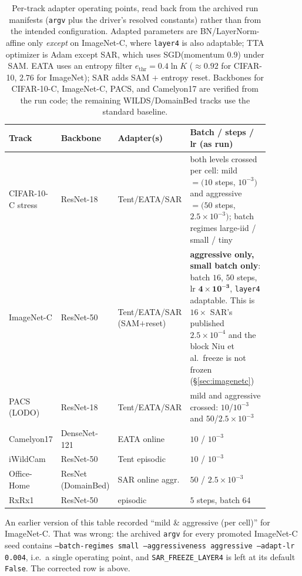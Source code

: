 \begin{table}[t]\centering\footnotesize
\caption{Per-track adapter operating points, read back from the archived run manifests
(\texttt{argv} plus the driver's resolved constants) rather than from the intended configuration.
Adapted parameters are BN/LayerNorm-affine only \emph{except} on ImageNet-C, where
\texttt{layer4} is also adaptable; TTA optimizer is Adam except SAR, which uses
SGD(momentum $0.9$) under SAM. EATA uses an entropy filter $e_{\mathrm{thr}}{=}0.4\ln K$
($\approx0.92$ for CIFAR-10, $2.76$ for ImageNet); SAR adds SAM $+$ entropy reset.
Backbones for CIFAR-10-C, ImageNet-C, PACS, and Camelyon17 are verified from the run code; the
remaining WILDS/DomainBed tracks use the standard baseline.}
\label{tab:adapter-hparams}
\begin{tabular}{@{}p{0.17\linewidth}p{0.17\linewidth}p{0.20\linewidth}p{0.34\linewidth}@{}}
\toprule
Track & Backbone & Adapter(s) & Batch / steps / lr (as run) \\
\midrule
CIFAR-10-C stress & ResNet-18 & Tent/EATA/SAR & both levels crossed per cell: mild $=(10$ steps, $10^{-3})$ and aggressive $=(50$ steps, $2.5{\times}10^{-3})$; batch regimes large-iid / small / tiny \\
ImageNet-C & ResNet-50 & Tent/EATA/SAR (SAM$+$reset) & \textbf{aggressive only, small batch only}: batch $16$, $50$ steps, lr $\mathbf{4{\times}10^{-3}}$, \texttt{layer4} adaptable. This is $16\times$ SAR's published $2.5{\times}10^{-4}$ and the block Niu et al.\ freeze is not frozen (\S\ref{sec:imagenetc}) \\
PACS (LODO) & ResNet-18 & Tent/EATA/SAR & mild and aggressive crossed: $10$/$10^{-3}$ and $50$/$2.5{\times}10^{-3}$ \\
Camelyon17 & DenseNet-121 & EATA online & $10$ / $10^{-3}$ \\
iWildCam & ResNet-50 & Tent episodic & $10$ / $10^{-3}$ \\
Office-Home & ResNet (DomainBed) & SAR online aggr. & $50$ / $2.5{\times}10^{-3}$ \\
RxRx1 & ResNet-50 & episodic & $5$ steps, batch $64$ \\
\bottomrule
\end{tabular}

\vspace{2pt}
{\footnotesize An earlier version of this table recorded ``mild \& aggressive (per cell)'' for
ImageNet-C. That was wrong: the archived \texttt{argv} for every promoted ImageNet-C seed contains
\texttt{--batch-regimes small --aggressiveness aggressive --adapt-lr 0.004}, i.e.\ a single
operating point, and \texttt{SAR\_FREEZE\_LAYER4} is left at its default \texttt{False}. The
corrected row is above.}
\end{table}

